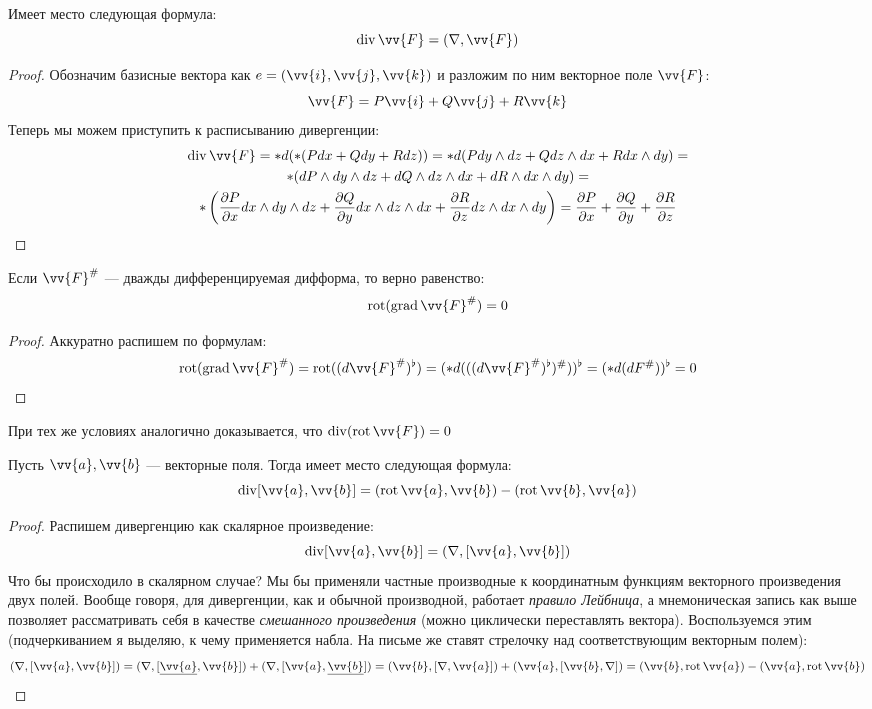 \begin{proposition}
	Имеет место следующая формула:
	\[
		\Div \vv{F} = (\nabla, \vv{F})
	\]
\end{proposition}

\begin{proof}
	Обозначим базисные вектора как $e = (\vv{i}, \vv{j}, \vv{k})$ и разложим по ним векторное поле $\vv{F}$:
	\[
		\vv{F} = P\vv{i} + Q\vv{j} + R\vv{k}
	\]
	Теперь мы можем приступить к расписыванию дивергенции:
	\begin{multline*}
		\Div \vv{F} = *d(*(Pdx + Qdy + Rdz)) = *d(Pdy \wedge dz + Qdz \wedge dx + Rdx \wedge dy) =
		\\
		*(dP \wedge dy \wedge dz + dQ \wedge dz \wedge dx + dR \wedge dx \wedge dy) =
		\\
		*\ps{\pd{P}{x} dx \wedge dy \wedge dz + \pd{Q}{y} dx \wedge dz \wedge dx + \pd{R}{z} dz \wedge dx \wedge dy} = \pd{P}{x} + \pd{Q}{y} + \pd{R}{z}
	\end{multline*}
\end{proof}

\begin{proposition}
	Если $\vv{F}^\#$ --- дважды дифференцируемая дифформа, то верно равенство:
	\[
		\rot(\grad \vv{F}^\#) = 0
	\]
\end{proposition}

\begin{proof}
	Аккуратно распишем по формулам:
	\[
		\rot(\grad \vv{F}^\#) = \rot((d\vv{F}^\#)^\flat) = (*d(((d\vv{F}^\#)^\flat)^\#))^\flat = (*d(dF^\#))^\flat = 0
	\]
\end{proof}

\begin{note}
	При тех же условиях аналогично доказывается, что $\Div(\rot \vv{F}) = 0$
\end{note}

\begin{proposition}
	Пусть $\vv{a}, \vv{b}$ --- векторные поля. Тогда имеет место следующая формула:
	\[
		\Div[\vv{a}, \vv{b}] = (\rot\vv{a}, \vv{b}) - (\rot\vv{b}, \vv{a})
	\]
\end{proposition}

\begin{proof}
	Распишем дивергенцию как скалярное произведение:
	\[
		\Div[\vv{a}, \vv{b}] = (\nabla, [\vv{a}, \vv{b}])
	\]
	Что бы происходило в скалярном случае? Мы бы применяли частные производные к координатным функциям векторного произведения двух полей. Вообще говоря, для дивергенции, как и обычной производной, работает \textit{правило Лейбница}, а мнемоническая запись как выше позволяет рассматривать себя в качестве \textit{смешанного произведения} (можно циклически переставлять вектора). Воспользуемся этим (подчеркиванием я выделяю, к чему применяется набла. На письме же ставят стрелочку над соответствующим векторным полем):
	\[
		(\nabla, [\vv{a}, \vv{b}]) = (\nabla, [\ule{\vv{a}}, \vv{b}]) + (\nabla, [\vv{a}, \ule{\vv{b}}]) = (\vv{b}, [\nabla, \vv{a}]) + (\vv{a}, [\vv{b}, \nabla]) = (\vv{b}, \rot \vv{a}) - (\vv{a}, \rot \vv{b})
	\]
\end{proof}

